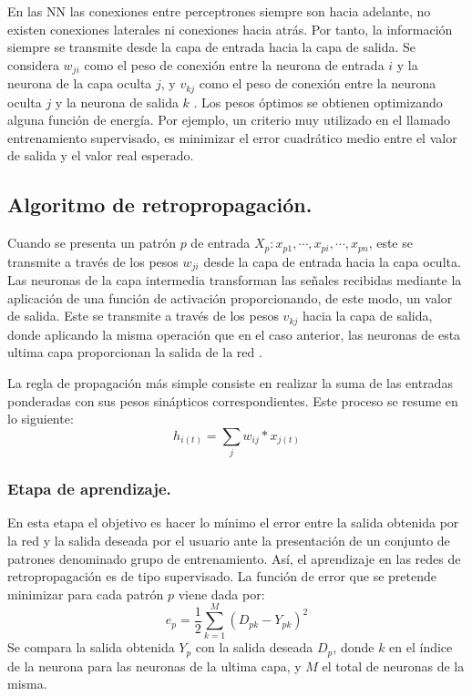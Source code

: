 \documentclass[12pt,letterpaper,oneside,openright]{book}
\begin{document}
 	En las NN las conexiones entre perceptrones siempre son hacia adelante, no existen conexiones laterales ni conexiones hacia atrás. Por tanto, la información siempre se transmite desde la capa de entrada hacia la capa de salida. Se considera $w_{ji}$ como el peso de conexión entre la neurona de entrada $i$ y la neurona de la capa oculta $j$, y $v_{kj}$ como el peso de conexión entre la neurona oculta $j$ y la neurona de salida $k$ \cite{percepMulti}. Los pesos óptimos se obtienen optimizando alguna función de energía. Por ejemplo, un criterio muy utilizado en el llamado entrenamiento supervisado, es minimizar el error cuadrático medio entre el valor de salida y el valor real esperado.
 	
 	\subsection{Algoritmo de retropropagación.}
 	Cuando se presenta un patrón $p$ de entrada $X_p : x_{p1},\dotsb,x_{pi},\dotsb,x_{pn}$, este se transmite a través de los pesos $w_{ji}$ desde la capa de entrada hacia la capa oculta. Las neuronas de la capa intermedia transforman las señales recibidas mediante la aplicación de una función de activación proporcionando, de este modo, un valor de salida. Este se transmite a través de los pesos $v_{kj}$ hacia la capa de salida, donde aplicando la misma operación que en el caso anterior, las neuronas de esta ultima capa proporcionan la salida de la red \cite{percepMulti,perceptron}.
 	
 	La regla de propagación más simple consiste en realizar la suma de las entradas ponderadas con sus pesos sinápticos correspondientes. Este proceso se resume en lo siguiente:
 	\begin{equation}
 		\label{eq:pesosxentrada}
 		h_{i(t)} = \sum_j w_{ij} \ast x_{j(t)}
 	\end{equation}
 	
 	\subsubsection{Etapa de aprendizaje.}
 	En esta etapa el objetivo es hacer lo mínimo el error entre la salida obtenida por la red y la salida deseada por el usuario ante la presentación de un conjunto de patrones denominado grupo de entrenamiento. Así, el aprendizaje en las redes de retropropagación es de tipo supervisado. La función de error que se pretende minimizar para cada patrón $p$ viene dada por:
 	\begin{equation}
 		\label{eq:error_a_minimizar}
 		e_p = \frac{1}{2}\sum_{k=1}^{M} (D_{pk} - Y_{pk})^2
 	\end{equation}
 	Se compara la salida obtenida $Y_p$ con la salida deseada $D_p$, donde $k$ en el índice de la neurona para las neuronas de la ultima capa, y $M$ el total de neuronas de la misma.
 	
\end{document}
